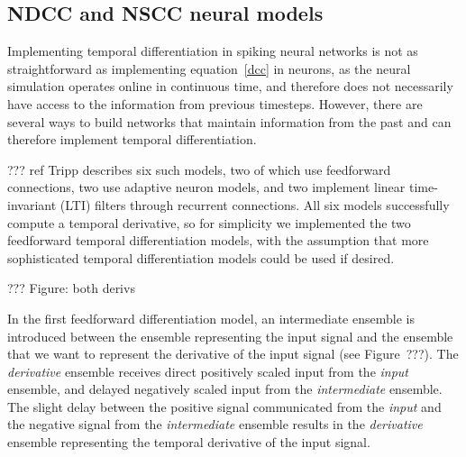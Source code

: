 
\subsection{NDCC and NSCC neural models}

Implementing temporal differentiation
in spiking neural networks
is not as straightforward as implementing
equation~\eqref{dcc} in neurons,
as the neural simulation operates
online in continuous time,
and therefore does not necessarily
have access to the information
from previous timesteps.
However, there are several ways
to build networks that maintain
information from the past
and can therefore implement temporal differentiation.

??? ref Tripp describes six such models,
two of which use feedforward connections,
two use adaptive neuron models,
and two implement linear time-invariant (LTI) filters
through recurrent connections.
All six models successfully
compute a temporal derivative,
so for simplicity we implemented
the two feedforward temporal differentiation models,
with the assumption that
more sophisticated temporal differentiation
models could be used if desired.

??? Figure: both derivs

In the first feedforward differentiation model,
an intermediate ensemble is introduced
between the ensemble representing the input signal
and the ensemble that we want to represent
the derivative of the input signal
(see Figure~???).
The \textit{derivative} ensemble
receives direct positively scaled input from
the \textit{input} ensemble,
and delayed negatively scaled input from
the \textit{intermediate} ensemble.
The slight delay between the positive signal
communicated from the \textit{input}
and the negative signal
from the \textit{intermediate} ensemble
results in the \textit{derivative} ensemble
representing the temporal derivative
of the input signal.

